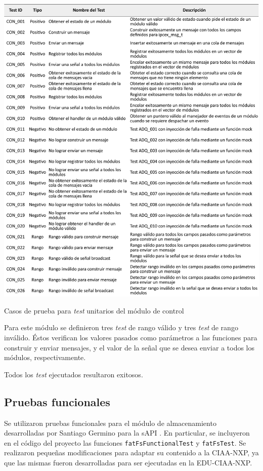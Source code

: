 \begin{table}[!htpb]
	\centering
	\includegraphics[width=\textwidth]{./Figures/TestCON.pdf}
	\caption{Casos de prueba para \textit{test} unitarios del módulo de control}
	\label{tab:test_control}
\end{table}

Para este módulo se definieron tres \textit{test} de rango válido y tres \textit{test} de rango inválido. Éstos verifican los valores pasados como parámetros a las funciones para construir y enviar mensajes, y el valor de la señal que se desea enviar a todos los módulos, respectivamente.

Todos los \textit{test} ejecutados resultaron exitosos.

\subsection{Pruebas funcionales}
\label{subsec:pruebasFuncionales}

Se utilizaron pruebas funcionales para el módulo de almacenamiento desarrolladas por Santiago Germino para la sAPI \citep{pruebasfuncionales}.  En particular, se incluyeron en el código del proyecto las funciones \texttt{fatFsFunctionalTest} y \texttt{fatFsTest}. Se realizaron pequeñas modificaciones para adaptar su contenido a la CIAA-NXP, ya que las mismas fueron desarrolladas para ser ejecutadas en la EDU-CIAA-NXP.

